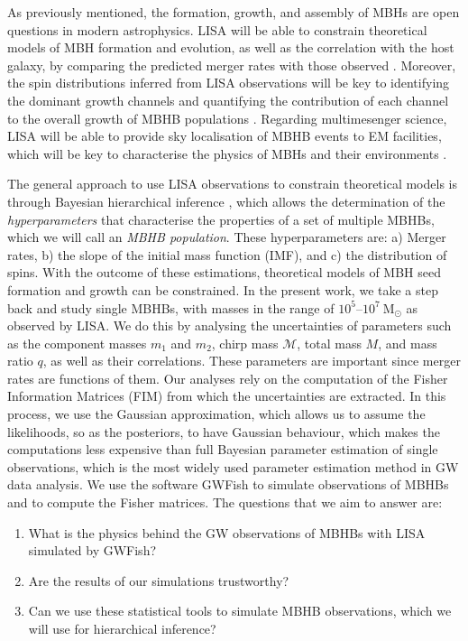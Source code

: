 \documentclass[a4paper,12pt]{article}
\begin{document}
As previously mentioned, the formation, growth, and assembly of MBHs are open questions in modern astrophysics. LISA will be able to constrain theoretical models of MBH formation and evolution, as well as the correlation with the host galaxy, by comparing the predicted merger rates with those observed \cite{amaro2023astrophysics}. Moreover, the spin distributions inferred from LISA observations will be key to identifying the dominant growth channels and quantifying the contribution of each channel to the overall growth of MBHB populations \cite{amaro2023astrophysics}. Regarding multimesenger science, LISA will be able to provide sky localisation of MBHB events to EM facilities, which will be key to characterise the physics of MBHs and their environments \cite{amaro2023astrophysics}.

The general approach to use LISA observations to constrain theoretical models is through Bayesian hierarchical inference \cite{mandel2019extracting}, which allows the determination of the \textit{hyperparameters} that characterise the properties of a set of multiple MBHBs, which we will call an \textit{MBHB population}. These hyperparameters are: a) Merger rates, b) the slope of the initial mass function (IMF), and c) the distribution of spins. With the outcome of these estimations, theoretical models of MBH seed formation and growth can be constrained. In the present work, we take a step back and study single MBHBs, with masses in the range of $10^{5}$--$10^{7}~\mathrm{M}_{\odot}$ as observed by LISA. We do this by analysing the uncertainties of parameters such as the component masses $m_1$ and $m_2$, chirp mass $\mathcal{M}$, total mass $M$, and mass ratio $q$, as well as their correlations. These parameters are important since merger rates are functions of them. Our analyses rely on the computation of the Fisher Information Matrices (FIM) \cite{cutler1994gravitational,vallisneri2008use} from which the uncertainties are extracted. In this process, we use the Gaussian approximation, which allows us to assume the likelihoods, so as the posteriors, to have Gaussian behaviour, which makes the computations less expensive than full Bayesian parameter estimation of single observations, which is the most widely used parameter estimation method in GW data analysis. We use the software GWFish \cite{dupletsa2023gwfish} to simulate observations of MBHBs and to compute the Fisher matrices. The questions that we aim to answer are:
\begin{enumerate}
\item What is the physics behind the GW observations of MBHBs with LISA simulated by GWFish?
\item Are the results of our simulations trustworthy?
\item Can we use these statistical tools to simulate MBHB observations, which we will use for hierarchical inference?
\end{enumerate}
\end{document}
